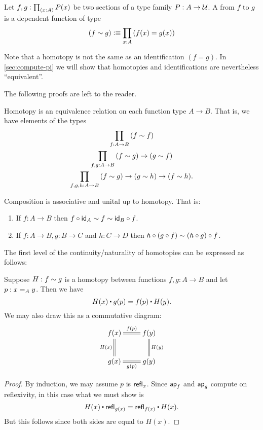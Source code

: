 \begin{defn} \label{defn:homotopy}
  Let $f,g:\prd{x:A} P(x)$ be two sections of a type family $P:A\to\type$.
  A %
  from $f$ to $g$ is a dependent function of type
  \begin{equation*}
    (f\htpy g) \defeq \prd{x:A} (f(x)=g(x))
  \end{equation*}
\end{defn}

Note that a homotopy is not the same as an identification $(f=g)$.
In \autoref{sec:compute-pi} we will show that homotopies and identifications are nevertheless ``equivalent''.

The following proofs are left to the reader.

\begin{lem}\label{lem:homotopy-props}
  Homotopy is an equivalence relation on each function type $A\to B$.
  That is, we have elements of the types
  \begin{gather*}
    \prd{f:A\to B} (f\htpy f)\\
    \prd{f,g:A\to B} (f\htpy g) \to (g\htpy f)\\
    \prd{f,g,h:A\to B} (f\htpy g) \to (g\htpy h) \to (f\htpy h).
  \end{gather*}
\end{lem}

\begin{lem}
  Composition is associative and unital up to homotopy.
  That is:
  \begin{enumerate}
  \item If $f:A\to B$ then $f\circ \idfunc[A]\htpy f\htpy \idfunc[B]\circ f$.
  \item If $f:A\to B, g:B\to C$ and $h:C\to D$ then $h\circ (g\circ f) \htpy (h\circ g)\circ f$.
  \end{enumerate}
\end{lem}

The first level of the continuity/naturality of homotopies can be expressed as follows:

\begin{lem}\label{lem:htpy-natural}
  Suppose $H:f\htpy g$ is a homotopy between functions $f,g:A\to B$ and let $p:\id[A]xy$.  Then we have
  \begin{equation*}
    H(x)\ct\ap{g}{p}=\ap{f}{p}\ct H(y).
  \end{equation*}
  We may also draw this as a commutative diagram:
  \begin{align*}
    \xymatrix{
      f(x) \ar@{=}[r]^{\ap fp} \ar@{=}[d]_{H(x)} & f(y) \ar@{=}[d]^{H(y)} \\
      g(x) \ar@{=}[r]_{\ap gp} & g(y)
    }
  \end{align*}
\end{lem}
\begin{proof}
  By induction, we may assume $p$ is $\refl x$.
  Since $\apfunc{f}$ and $\apfunc g$ compute on reflexivity, in this case what we must show is
  \[ H(x) \ct \refl{g(x)} = \refl{f(x)} \ct H(x). \]
  But this follows since both sides are equal to $H(x)$.
\end{proof}

